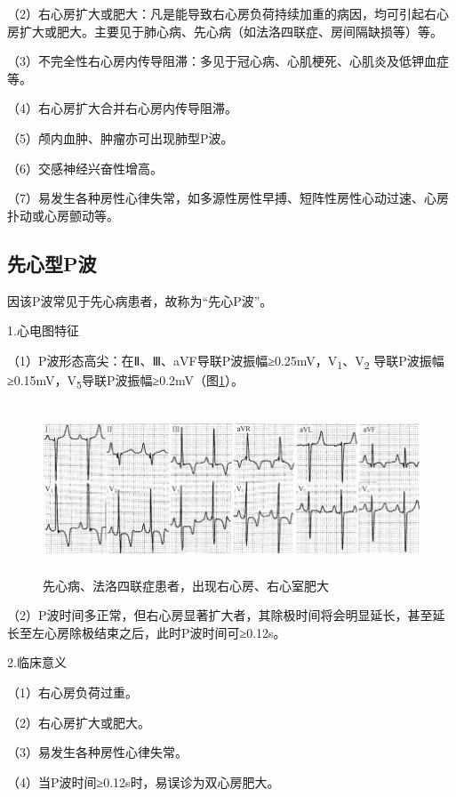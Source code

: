 （2）右心房扩大或肥大：凡是能导致右心房负荷持续加重的病因，均可引起右心房扩大或肥大。主要见于肺心病、先心病（如法洛四联症、房间隔缺损等）等。

（3）不完全性右心房内传导阻滞：多见于冠心病、心肌梗死、心肌炎及低钾血症等。

（4）右心房扩大合并右心房内传导阻滞。

（5）颅内血肿、肿瘤亦可出现肺型P波。

（6）交感神经兴奋性增高。

（7）易发生各种房性心律失常，如多源性房性早搏、短阵性房性心动过速、心房扑动或心房颤动等。

\protect\hypertarget{text00007.htmlux5cux23subid6}{}{}

\subsection{先心型P波}

因该P波常见于先心病患者，故称为“先心P波”。

1.心电图特征

（1）P波形态高尖：在Ⅱ、Ⅲ、aVF导联P波振幅≥0.25mV，V\textsubscript{1}、V\textsubscript{2} 导联P波振幅≥0.15mV，V\textsubscript{5}导联P波振幅≥0.2mV（图\ref{fig1-4}）。

\begin{figure}[!htbp]
 \centering
 \includegraphics[width=5.78125in,height=1.97917in]{./images/Image00009.jpg}
 \captionsetup{justification=centering}
 \caption{先心病、法洛四联症患者，出现右心房、右心室肥大}
 \label{fig1-4}
  \end{figure} 

（2）P波时间多正常，但右心房显著扩大者，其除极时间将会明显延长，甚至延长至左心房除极结束之后，此时P波时间可≥0.12s。

2.临床意义

（1）右心房负荷过重。

（2）右心房扩大或肥大。

（3）易发生各种房性心律失常。

（4）当P波时间≥0.12s时，易误诊为双心房肥大。

